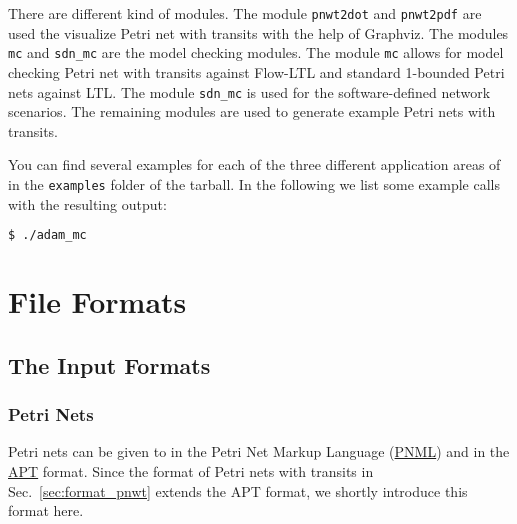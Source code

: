 \documentclass[12pt,twoside,a4paper,openright]{memoir}
\begin{document}
There are different kind of modules.
The module \texttt{pnwt2dot} and \texttt{pnwt2pdf} are
used the visualize Petri net with transits with the help of Graphviz.
The modules \texttt{mc} and \texttt{sdn\_mc} are the model checking modules.
The module \texttt{mc} allows for model checking Petri net with transits against Flow-LTL
and standard 1-bounded Petri nets against LTL.
The module \texttt{sdn\_mc} is used for the software-defined network scenarios.
The remaining modules are used to generate example Petri nets with transits.  

You can find several examples for each of the three different 
application areas of \tool{} in the \texttt{examples} folder of the tarball.
In the following we list some example calls
with the resulting output:
\begin{lstlisting}[language=bash]
  $ ./adam_mc
\end{lstlisting}

\chapter{File Formats}
\section{The Input Formats}
\subsection{Petri Nets}
Petri nets can be given to \tool{} in the Petri Net Markup Language (\href{http://www.pnml.org/}{PNML})
and in the \href{https://github.com/CvO-Theory/apt}{APT} format.
Since the format of Petri nets with transits in Sec.~\ref{sec:format_pnwt} extends the APT format,
we shortly introduce this format here.
\end{document}
